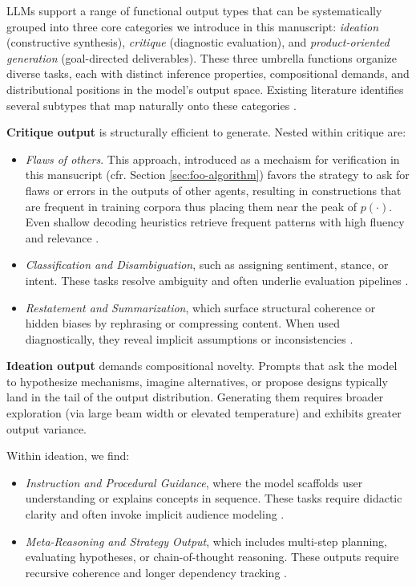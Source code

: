 \documentclass[12pt]{article}
\theoremstyle{definition}
\begin{document}
LLMs support a range of functional output types that can be systematically grouped into three core categories we introduce in this manuscript: \emph{ideation} (constructive synthesis), \emph{critique} (diagnostic evaluation), and \emph{product-oriented generation} (goal-directed deliverables). These three umbrella functions organize diverse tasks, each with distinct inference properties, compositional demands, and distributional positions in the model's output space. Existing literature identifies several subtypes that map naturally onto these categories \parencite{bommasani2021opportunities, mialon2023augmented}.

\textbf{Critique output} is structurally efficient to generate. 
Nested within critique are:
\begin{itemize}
    \item \emph{Flaws of others}. This approach, introduced as a mechaism for verification in this mansucript (cfr. Section \ref{sec:foo-algorithm}) favors the strategy to ask for flaws  or errors in the outputs of other agents, resulting in constructions %
    that are frequent in training corpora thus placing them near the peak of $p(\cdot)$. 
    Even shallow decoding heuristics retrieve frequent patterns with high fluency and relevance \parencite{wei2022chain}.
  \item \emph{Classification and Disambiguation}, such as assigning sentiment, stance, or intent. These tasks resolve ambiguity and often underlie evaluation pipelines \parencite{mialon2023augmented}.
  \item \emph{Restatement and Summarization}, which surface structural coherence or hidden biases by rephrasing or compressing content. When used diagnostically, they reveal implicit assumptions or inconsistencies \parencite{maynez2020faithfulness}.
\end{itemize}

\textbf{Ideation output} demands compositional novelty. Prompts that ask the model to hypothesize mechanisms, imagine alternatives, or propose designs typically land in the tail of the output distribution. Generating them requires broader exploration (via large beam width or elevated temperature) and exhibits greater output variance.

Within ideation, we find:
\begin{itemize}
  \item \emph{Instruction and Procedural Guidance}, where the model scaffolds user understanding or explains concepts in sequence. These tasks require didactic clarity and often invoke implicit audience modeling \parencite{ouyang2022training}.
  \item \emph{Meta-Reasoning and Strategy Output}, which includes multi-step planning, evaluating hypotheses, or chain-of-thought reasoning. These outputs require recursive coherence and longer dependency tracking \parencite{wei2022chain}.
\end{itemize}
\end{document}
